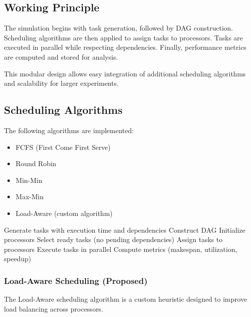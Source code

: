 \documentclass[12pt,a4paper]{article}
\begin{document}
\subsection*{Working Principle}

The simulation begins with task generation, followed by DAG construction. Scheduling algorithms are then applied to assign tasks to processors. Tasks are executed in parallel while respecting dependencies. Finally, performance metrics are computed and stored for analysis.

This modular design allows easy integration of additional scheduling algorithms and scalability for larger experiments.

\subsection{Scheduling Algorithms}

The following algorithms are implemented:

\begin{itemize}
\item FCFS (First Come First Serve)
\item Round Robin
\item Min-Min
\item Max-Min
\item Load-Aware (custom algorithm)
\end{itemize}

\begin{algorithm}
\caption{Parallel Task Scheduling Simulator}
\begin{algorithmic}[1]
\State Generate tasks with execution time and dependencies
\State Construct DAG
    \State Initialize processors
        \State Select ready tasks (no pending dependencies)
        \State Assign tasks to processors
        \State Execute tasks in parallel
    \EndWhile
    \State Compute metrics (makespan, utilization, speedup)
\EndFor
\end{algorithmic}
\end{algorithm}

\subsubsection{Load-Aware Scheduling (Proposed)}

The Load-Aware scheduling algorithm is a custom heuristic designed to improve load balancing across processors.
\end{document}
